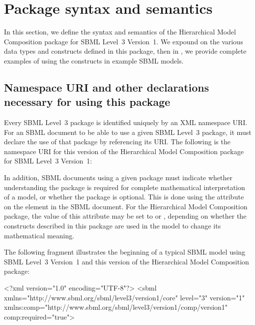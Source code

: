
\newcommand{\fixttspace}{\hspace*{1pt}}

\section{Package syntax and semantics}
\label{sec:syntax}

In this section, we define the syntax and semantics of the Hierarchical
Model Composition package for SBML Level~3 Version~1.  We expound on the
various data types and constructs defined in this package, then in
, we provide complete examples of using the constructs in
example SBML models.

\subsection{Namespace URI and other declarations necessary for using this package}
\label{xml-namespace}

Every SBML Level~3 package is identified uniquely by an XML namespace
URI.  For an SBML document to be able to use a given SBML Level~3
package, it must declare the use of that package by referencing its URI.
The following is the namespace URI for this version of the Hierarchical
Model Composition package for SBML Level~3 Version~1:
\begin{center}
\end{center}

In addition, SBML documents using a given package must indicate whether
understanding the package is required for complete mathematical
interpretation of a model, or whether the package is optional.  This is
done using the attribute  on the  element
in the SBML document.  For the Hierarchical Model Composition package,
the value of this attribute may be set to  or ,
depending on whether the constructs described in this package are used
in the model to change its mathematical meaning.

The following fragment illustrates the beginning of a typical SBML model
using SBML Level~3 Version~1 and this version of the Hierarchical Model
Composition package:

\begin{example}
<?xml version="1.0" encoding="UTF-8"?>
<sbml xmlns="http://www.sbml.org/sbml/level3/version1/core" level="3" version="1"
      xmlns:comp="http://www.sbml.org/sbml/level3/version1/comp/version1" comp:required="true">
\end{example}
    

